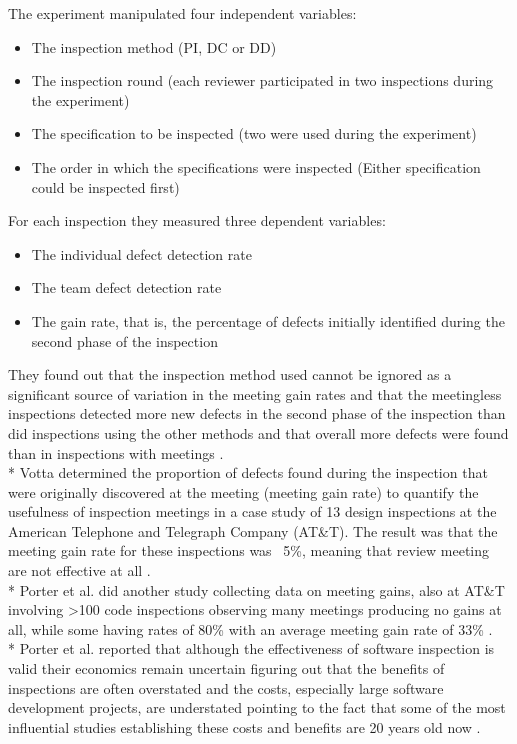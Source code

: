 The experiment manipulated four independent variables:
\begin{itemize}
	\item The inspection method (PI, DC or DD)
	\item The inspection round (each reviewer participated in two inspections during the experiment)
	\item The specification to be inspected (two were used during the experiment)
	\item The order in which the specifications were inspected (Either specification could be inspected first)
\end{itemize}
For each inspection they measured three dependent variables:
\begin{itemize}
	\item The individual defect detection rate
	\item The team defect detection rate
	\item The gain rate, that is, the percentage of defects initially identified during the second phase of the inspection
\end{itemize}
They found out that the inspection method used cannot be ignored as a significant source of variation in the meeting gain rates and that the meetingless inspections detected more new defects in the second phase of the inspection than did inspections using the other methods and that overall more defects were found than in inspections with meetings \cite{mccarthy1996experiment}. \\*
Votta determined the proportion of defects found during the inspection that were originally discovered at the meeting (meeting gain rate) to quantify the usefulness of inspection meetings in a case study of 13 design inspections at the American Telephone and Telegraph Company (AT\&T). The result was that the meeting gain rate for these inspections was ~5\%, meaning that review meeting are not effective at all \cite{votta1993does}. \\*
Porter et al. did another study collecting data on meeting gains, also at AT\&T involving >100 code inspections observing many meetings producing no gains at all, while some having rates of 80\% with an average meeting gain rate of 33\% \cite{porter1995experiment}. \\*
Porter et al. reported that although the effectiveness of software inspection is valid their economics remain uncertain figuring out that the benefits of inspections are often overstated and the costs, especially large software development projects, are understated pointing to the fact that some of the most influential studies establishing these costs and benefits are 20 years old now \cite{porter1996review}.
